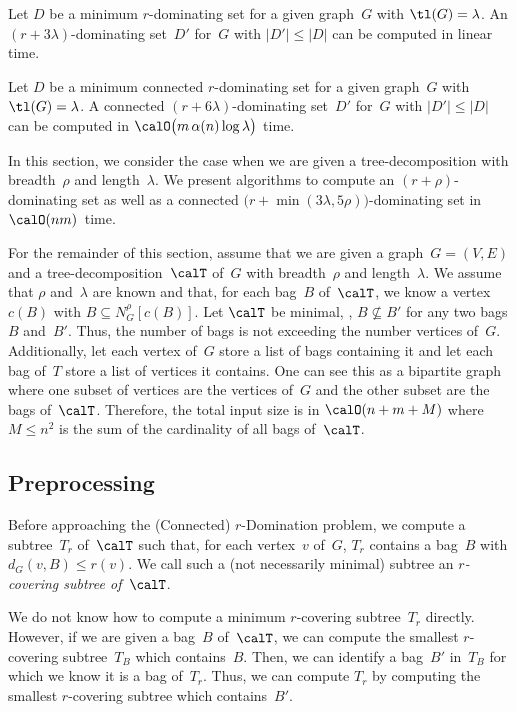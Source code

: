 \begin{corollary}
Let \( D \) be a minimum \( r \)-dominating set for a given graph~\( G \) with \( \tl(G) = \lambda \).
An \( (r + 3 \lambda) \)-dominating set~\( D' \) for~\( G \) with \( |D'| \leq |D| \) can be computed in linear time.
\end{corollary}

\begin{corollary}
Let \( D \) be a minimum connected \( r \)-dominating set for a given graph~\( G \) with \( \tl(G) = \lambda \).
A connected \( (r + 6 \lambda) \)-dominating set~\( D' \) for~\( G \) with \( |D'| \leq |D| \) can be computed in \( \calO \big( m \, \alpha(n) \log \lambda \big) \) time.
\end{corollary}

In this section, we consider the case when we are given a tree-decomposition with breadth~$\rho$ and length~$\lambda$.
We present algorithms to compute an $(r + \rho)$-dominating set as well as a connected $\big(r + \min (3 \lambda, 5 \rho) \big)$-dominating set in $\calO(nm)$~time.

For the remainder of this section, assume that we are given a graph~$G = (V, E)$ and a tree-decomposition~$\calT$ of~$G$ with breadth~$\rho$ and length~$\lambda$.
We assume that $\rho$ and~$\lambda$ are known and that, for each bag~$B$ of~$\calT$, we know a vertex~$c(B)$ with $B \subseteq N_G^\rho[c(B)]$.
Let $\calT$ be minimal, \ie, $B \nsubseteq B'$ for any two bags $B$ and~$B'$.
Thus, the number of bags is not exceeding the number vertices of~$G$.
Additionally, let each vertex of~$G$ store a list of bags containing it and let each bag of~$T$ store a list of vertices it contains.
One can see this as a bipartite graph where one subset of vertices are the vertices of~$G$ and the other subset are the bags of~$\calT$.
Therefore, the total input size is in $\calO(n + m + M)$ where $M \leq n^2$ is the sum of the cardinality of all bags of~$\calT$.


\subsection{Preprocessing}

Before approaching the (Connected) $r$-Domination problem, we compute a subtree~$T_r$ of~$\calT$ such that, for each vertex~$v$ of~$G$, $T_r$ contains a bag~$B$ with $d_G(v, B) \leq r(v)$.
We call such a (not necessarily minimal) subtree an \emph{\( r \)-covering subtree of~\( \calT \)}.

We do not know how to compute a minimum $r$-covering subtree~$T_r$ directly.
However, if we are given a bag~$B$ of~$\calT$, we can compute the smallest $r$-covering subtree~$T_B$ which contains~$B$.
Then, we can identify a bag~$B'$ in~$T_B$ for which we know it is a bag of~$T_r$.
Thus, we can compute $T_r$ by computing the smallest $r$-covering subtree which contains~$B'$.

